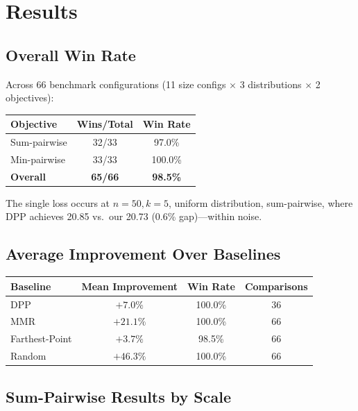 \documentclass[11pt,a4paper]{article}
\begin{document}
\section{Results}

\subsection{Overall Win Rate}

Across 66 benchmark configurations (11 size configs $\times$ 3 distributions $\times$ 2 objectives):

\begin{center}
\begin{tabular}{lcc}
\toprule
\textbf{Objective} & \textbf{Wins/Total} & \textbf{Win Rate} \\
\midrule
Sum-pairwise & 32/33 & 97.0\% \\
Min-pairwise & 33/33 & 100.0\% \\
\midrule
\textbf{Overall} & \textbf{65/66} & \textbf{98.5\%} \\
\bottomrule
\end{tabular}
\end{center}

The single loss occurs at $n=50, k=5$, uniform distribution, sum-pairwise, where DPP achieves 20.85 vs.\ our 20.73 (0.6\% gap)---within noise.

\subsection{Average Improvement Over Baselines}

\begin{center}
\begin{tabular}{lccc}
\toprule
\textbf{Baseline} & \textbf{Mean Improvement} & \textbf{Win Rate} & \textbf{Comparisons} \\
\midrule
DPP & $+7.0\%$ & 100.0\% & 36 \\
MMR & $+21.1\%$ & 100.0\% & 66 \\
Farthest-Point & $+3.7\%$ & 98.5\% & 66 \\
Random & $+46.3\%$ & 100.0\% & 66 \\
\bottomrule
\end{tabular}
\end{center}

\subsection{Sum-Pairwise Results by Scale}
\end{document}
